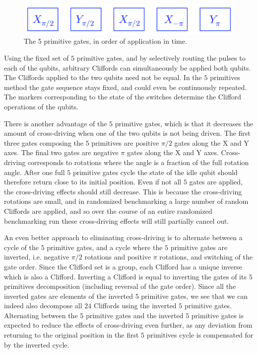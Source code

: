         \begin{figure}[h!]
          \centering
          \includegraphics[width=.5\textwidth]{../Figures/Randomized benchmarking/5 primitive gates.jpg}
          \caption{The 5 primitive gates, in order of application in time.}
          \label{5 primitive gates}
        \end{figure}

        Using the fixed set of $5$ primitive gates, and by selectively routing the pulses to each of the qubits, arbitrary Cliffords can simultaneously be applied both qubits. The Cliffords applied to the two qubits need not be equal. In the $5$ primitives method the gate sequence stays fixed, and could even be continuously repeated. The markers corresponding to the state of the switches determine the Clifford operations of the qubits.

        There is another advantage of the $5$ primitive gates, which is that it decreases the amount of cross-driving when one of the two qubits is not being driven. The first three gates composing the $5$ primitives are positive $\pi/2$ gates along the X and Y axes. The final two gates are negative $\pi$ gates along the X and Y axes. Cross-driving corresponds to rotations where the angle is a fraction of the full rotation angle. After one full $5$ primitive gates cycle the state of the idle qubit should therefore return close to its initial position. Even if not all $5$ gates are applied, the cross-driving effects should still decrease. This is because the cross-driving rotations are small, and in randomized benchmarking a large number of random Cliffords are applied, and so over the course of an entire randomized benchmarking run these cross-driving effects will still partially cancel out.

        An even better approach to eliminating cross-driving is to alternate between a cycle of the $5$ primitive gates, and a cycle where the $5$ primitive gates are inverted, i.e. negative $\pi/2$ rotations and positive $\pi$ rotations, and switching of the gate order. Since the Clifford set is a group, each Clifford has a unique inverse which is also a Clifford. Inverting a Clifford is equal to inverting the gates of its $5$ primitives decomposition (including reversal of the gate order). Since all the inverted gates are elements of the inverted $5$ primitive gates, we see that we can indeed also decompose all $24$ Cliffords using the inverted $5$ primitive gates. Alternating between the $5$ primitive gates and the inverted $5$ primitive gates is expected to reduce the effects of cross-driving even further, as any deviation from returning to the original position in the first $5$ primitives cycle is compensated for by the inverted cycle.

